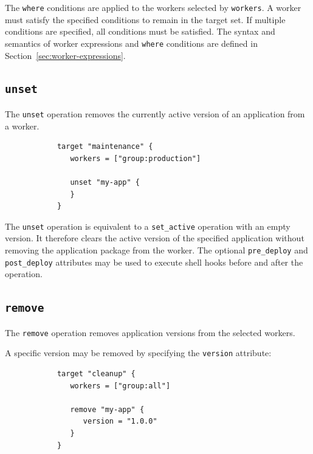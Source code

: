 \documentclass[11pt,a4paper]{article}
\begin{document}
    The \texttt{where} conditions are applied to the workers selected by \texttt{workers}.
    A worker must satisfy the specified conditions to remain in the target set.
    If multiple conditions are specified, all conditions must be satisfied.
    The syntax and semantics of worker expressions and \texttt{where} conditions are defined in Section~\ref{sec:worker-expressions}.

    \subsection{\texttt{unset}}\label{subsec:texttt:unset}

    The \texttt{unset} operation removes the currently active version of an application from a worker.

    \begin{center}
        \begin{verbatim}
            target "maintenance" {
               workers = ["group:production"]

               unset "my-app" {
               }
            }
        \end{verbatim}
    \end{center}

    The \texttt{unset} operation is equivalent to a \texttt{set\_active} operation with an empty version.
    It therefore clears the active version of the specified application without removing the application package from the worker.
    The optional \texttt{pre\_deploy} and \texttt{post\_deploy} attributes may be used to execute shell hooks before and after the operation.

    \subsection{\texttt{remove}}\label{subsec:texttt_target_remove}

    The \texttt{remove} operation removes application versions from the selected workers.

    A specific version may be removed by specifying the \texttt{version} attribute:

    \begin{center}
        \begin{verbatim}
            target "cleanup" {
               workers = ["group:all"]

               remove "my-app" {
                  version = "1.0.0"
               }
            }
        \end{verbatim}
    \end{center}
\end{document}
